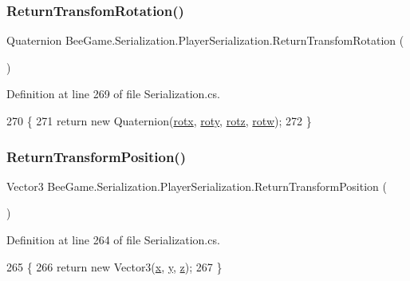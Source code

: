 \subsubsection{\texorpdfstring{Return\+Transfom\+Rotation()}{ReturnTransfomRotation()}}
{\footnotesize\ttfamily Quaternion Bee\+Game.\+Serialization.\+Player\+Serialization.\+Return\+Transfom\+Rotation (\begin{DoxyParamCaption}{ }\end{DoxyParamCaption})}



Definition at line 269 of file Serialization.\+cs.


\begin{DoxyCode}
270         \{
271             \textcolor{keywordflow}{return} \textcolor{keyword}{new} Quaternion(\hyperlink{class_bee_game_1_1_serialization_1_1_player_serialization_a5c7c1d06654a4aad49a3fb3b9cd11835}{rotx}, \hyperlink{class_bee_game_1_1_serialization_1_1_player_serialization_a5411f99b7942e8d4f848b001fc49c39f}{roty}, \hyperlink{class_bee_game_1_1_serialization_1_1_player_serialization_adfa5b8ed3fa3ef68460302186054dae5}{rotz}, \hyperlink{class_bee_game_1_1_serialization_1_1_player_serialization_af292d134d5b6171724f6797e390bde77}{rotw});
272         \}
\end{DoxyCode}
\mbox{\label{class_bee_game_1_1_serialization_1_1_player_serialization_a0dc185edb71e6952aeb2382ee0e51931}} 
\subsubsection{\texorpdfstring{Return\+Transform\+Position()}{ReturnTransformPosition()}}
{\footnotesize\ttfamily Vector3 Bee\+Game.\+Serialization.\+Player\+Serialization.\+Return\+Transform\+Position (\begin{DoxyParamCaption}{ }\end{DoxyParamCaption})}



Definition at line 264 of file Serialization.\+cs.


\begin{DoxyCode}
265         \{
266             \textcolor{keywordflow}{return} \textcolor{keyword}{new} Vector3(\hyperlink{class_bee_game_1_1_serialization_1_1_player_serialization_a36758d72f4f33b21f296f5e648b772a5}{x}, \hyperlink{class_bee_game_1_1_serialization_1_1_player_serialization_ada22143d639a1fbd59b52943362202ae}{y}, \hyperlink{class_bee_game_1_1_serialization_1_1_player_serialization_a9836712a8e5f645bea8304e50fb84e51}{z});
267         \}
\end{DoxyCode}


